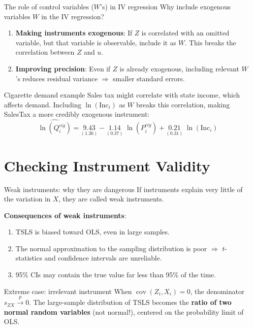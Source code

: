 \documentclass[10pt]{beamer}
\begin{document}
\begin{frame}{The role of control variables ($W$'s) in IV regression}
\label{slide:controls}
Why include exogenous variables $W$ in the IV regression?

\begin{enumerate}
  \item \textbf{Making instruments exogenous}: If $Z$ is correlated with an omitted variable, but that variable is observable, include it as $W$. This breaks the correlation between $Z$ and $u$.

  \pause
  \item \textbf{Improving precision}: Even if $Z$ is already exogenous, including relevant $W$'s reduces residual variance $\Rightarrow$ smaller standard errors.
\end{enumerate}

\pause
\begin{exampleblock}{Cigarette demand example}
Sales tax might correlate with state income, which affects demand. Including $\ln(\text{Inc}_i)$ as $W$ breaks this correlation, making SalesTax a more credibly exogenous instrument:
\[
\widehat{\ln(Q_i^{cig})} = \underset{(1.26)}{9.43} - \underset{(0.37)}{1.14}\;\ln(P_i^{cig}) + \underset{(0.31)}{0.21}\;\ln(\text{Inc}_i)
\]
\end{exampleblock}
\end{frame}

\section{Checking Instrument Validity}

\begin{frame}{Weak instruments: why they are dangerous}
\label{slide:weak_intro}
If instruments explain very little of the variation in $X$, they are called \alert{weak instruments}.

\vspace{0.5em}
\textbf{Consequences of weak instruments}:
\begin{enumerate}
  \item TSLS is \alert{biased toward OLS}, even in large samples.
  \item The normal approximation to the sampling distribution is \alert{poor} $\Rightarrow$ $t$-statistics and confidence intervals are unreliable.
  \item 95\% CIs may contain the true value far less than 95\% of the time.
\end{enumerate}

\pause
\begin{alertblock}{Extreme case: irrelevant instrument}
When $\operatorname{cov}(Z_i, X_i) = 0$, the denominator $s_{ZX} \xrightarrow{p} 0$. The large-sample distribution of TSLS becomes the \textbf{ratio of two normal random variables} (not normal!), centered on the probability limit of OLS.
\end{alertblock}
\end{frame}
\end{document}

